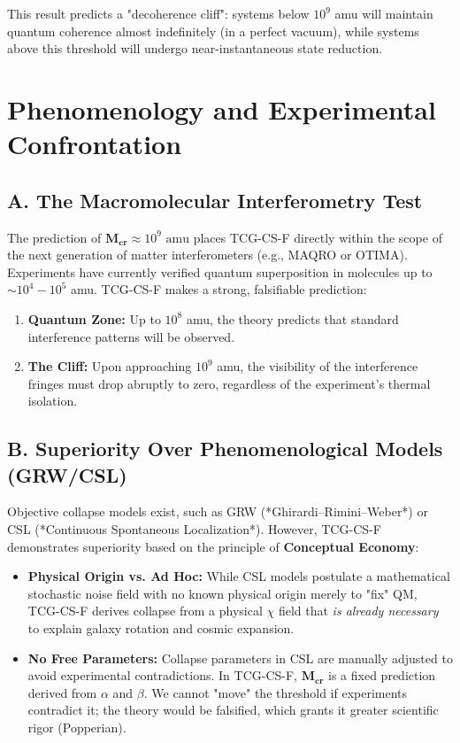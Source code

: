 \documentclass[11pt, a4paper]{article}
\begin{document}
This result predicts a "decoherence cliff": systems below $10^9$ amu will maintain quantum coherence almost indefinitely (in a perfect vacuum), while systems above this threshold will undergo near-instantaneous state reduction.

\section{Phenomenology and Experimental Confrontation}

\subsection{A. The Macromolecular Interferometry Test}

The prediction of $\mathbf{M_{cr}} \approx 10^9 \text{ amu}$ places TCG-CS-F directly within the scope of the next generation of matter interferometers (e.g., MAQRO or OTIMA).
Experiments have currently verified quantum superposition in molecules up to $\sim 10^4 - 10^5$ amu. TCG-CS-F makes a strong, falsifiable prediction:

\begin{enumerate}
    \item \textbf{Quantum Zone:} Up to $10^8$ amu, the theory predicts that standard interference patterns will be observed.
    \item \textbf{The Cliff:} Upon approaching $10^9$ amu, the visibility of the interference fringes must drop abruptly to zero, regardless of the experiment's thermal isolation.
\end{enumerate}

\subsection{B. Superiority Over Phenomenological Models (GRW/CSL)}

Objective collapse models exist, such as GRW (*Ghirardi–Rimini–Weber*) or CSL (*Continuous Spontaneous Localization*). However, TCG-CS-F demonstrates superiority based on the principle of \textbf{Conceptual Economy}:

\begin{itemize}
    \item \textbf{Physical Origin vs. Ad Hoc:} While CSL models postulate a mathematical stochastic noise field with no known physical origin merely to "fix" QM, TCG-CS-F derives collapse from a physical $\chi$ field that \textit{is already necessary} to explain galaxy rotation and cosmic expansion.
    \item \textbf{No Free Parameters:} Collapse parameters in CSL are manually adjusted to avoid experimental contradictions. In TCG-CS-F, $\mathbf{M_{cr}}$ is a fixed prediction derived from $\alpha$ and $\beta$. We cannot "move" the threshold if experiments contradict it; the theory would be falsified, which grants it greater scientific rigor (Popperian).
\end{itemize}
\end{document}

